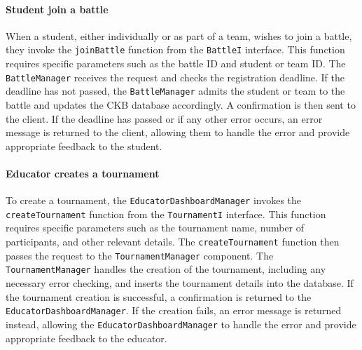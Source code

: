 \paragraph{Student join a battle}
When a student, either individually or as part of a team, wishes to join a battle, they invoke the \verb|joinBattle| function from the \verb|BattleI| interface. This function requires specific parameters such as the battle ID and student or team ID. 
The \verb|BattleManager| receives the request and checks the registration deadline. If the deadline has not passed, the \verb|BattleManager| admits the student or team to the battle and updates the CKB database accordingly. A confirmation is then sent to the client. 
If the deadline has passed or if any other error occurs, an error message is returned to the client, allowing them to handle the error and provide appropriate feedback to the student.

\paragraph{Educator creates a tournament}
To create a tournament, the \verb|EducatorDashboardManager| invokes the \verb|createTournament| function from the \verb|TournamentI| interface. 
This function requires specific parameters such as the tournament name, number of participants, and other relevant details. The \verb|createTournament| function then passes the request to the \verb|TournamentManager| component. 
The \verb|TournamentManager| handles the creation of the tournament, including any necessary error checking, and inserts the tournament details into the database. If the tournament creation is successful, a confirmation is returned to the \verb|EducatorDashboardManager|. 
If the creation fails, an error message is returned instead, allowing the \verb|EducatorDashboardManager| to handle the error and provide appropriate feedback to the educator.

